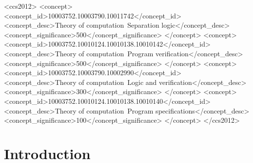 \documentclass[acmsmall]{acmart}\settopmatter{}
\begin{document}
\begin{CCSXML}
<ccs2012>
<concept>
<concept_id>10003752.10003790.10011742</concept_id>
<concept_desc>Theory of computation~Separation logic</concept_desc>
<concept_significance>500</concept_significance>
</concept>
<concept>
<concept_id>10003752.10010124.10010138.10010142</concept_id>
<concept_desc>Theory of computation~Program verification</concept_desc>
<concept_significance>500</concept_significance>
</concept>
<concept>
<concept_id>10003752.10003790.10002990</concept_id>
<concept_desc>Theory of computation~Logic and verification</concept_desc>
<concept_significance>300</concept_significance>
</concept>
<concept>
<concept_id>10003752.10010124.10010138.10010140</concept_id>
<concept_desc>Theory of computation~Program specifications</concept_desc>
<concept_significance>100</concept_significance>
</concept>
</ccs2012>
\end{CCSXML}






\maketitle

\section{Introduction}
\label{dummyref} %
\label{sec:intro}

\end{document}
